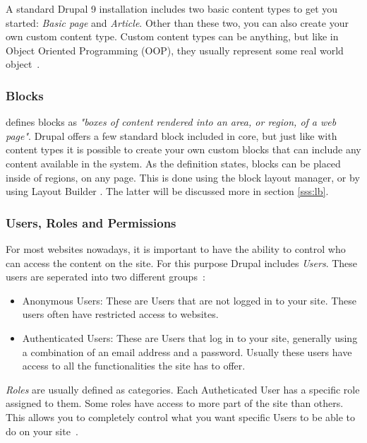 A standard Drupal 9 installation includes two basic content types to get you started: \emph{Basic page} and \emph{Article}. Other than these two, you can also create your own custom content type. Custom content types can be anything, but like in Object Oriented Programming (OOP), they usually represent some real world object~\autocite{Tomlinson2015}.

\subsubsection{Blocks}
\label{sss:blocks}

\textcite{Drupal2021} defines blocks as \emph{"boxes of content rendered into an area, or region, of a web page"}. Drupal offers a few standard block included in core, but just like with content types it is possible to create your own custom blocks that can include any content available in the system. As the definition states, blocks can be placed inside of regions, on any page. This is done using the block layout manager, or by using Layout Builder \autocite{Tomlinson2015}. The latter will be discussed more in section \ref{sss:lb}.

\subsubsection{Users, Roles and Permissions}

For most websites nowadays, it is important to have the ability to control who can access the content on the site. For this purpose Drupal includes \emph{Users}. These users are seperated into two different groups~\autocite{Tomlinson2015}:
\begin{itemize}
	\item  Anonymous Users: These are Users that are not logged in to your site. These users often have restricted access to websites.
	\item  Authenticated Users: These are Users that log in to your site, generally using a combination of an email address and a password. Usually these users have access to all the functionalities the site has to offer.
\end{itemize}

\emph{Roles} are usually defined as categories. Each Autheticated User has a specific role assigned to them. Some roles have access to more part of the site than others. This allows you to completely control what you want specific Users to be able to do on your site~\autocite{Tomlinson2015}.

